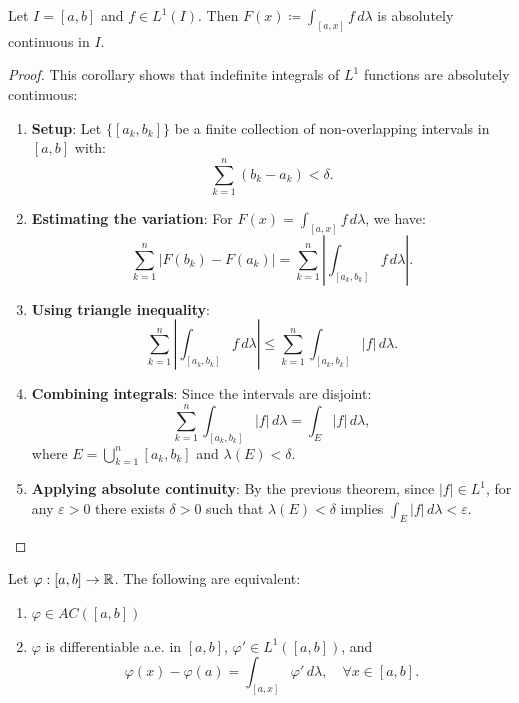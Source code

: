 \clearpage
\begin{corollary}
Let $I = [a,b]$ and $f \in L^1(I)$. Then $F(x) \coloneqq \int_{[a,x]} f \, d\lambda$ is absolutely continuous in $I$.
\end{corollary}

\begin{proof}
This corollary shows that indefinite integrals of $L^1$ functions are absolutely continuous:

\begin{enumerate}
\item \textbf{Setup}: Let $\{[a_k, b_k]\}$ be a finite collection of non-overlapping intervals in $[a,b]$ with:
\[
\sum_{k=1}^n (b_k - a_k) < \delta.
\]

\item \textbf{Estimating the variation}: For $F(x) = \int_{[a,x]} f \, d\lambda$, we have:
\[
\sum_{k=1}^n |F(b_k) - F(a_k)| = \sum_{k=1}^n \left| \int_{[a_k, b_k]} f \, d\lambda \right|.
\]

\item \textbf{Using triangle inequality}: 
\[
\sum_{k=1}^n \left| \int_{[a_k, b_k]} f \, d\lambda \right| \leq \sum_{k=1}^n \int_{[a_k, b_k]} |f| \, d\lambda.
\]

\item \textbf{Combining integrals}: Since the intervals are disjoint:
\[
\sum_{k=1}^n \int_{[a_k, b_k]} |f| \, d\lambda = \int_E |f| \, d\lambda,
\]
where $E = \bigcup_{k=1}^n [a_k, b_k]$ and $\lambda(E) < \delta$.

\item \textbf{Applying absolute continuity}: By the previous theorem, since $|f| \in L^1$, for any $\varepsilon > 0$ there exists $\delta > 0$ such that $\lambda(E) < \delta$ implies $\int_E |f| \, d\lambda < \varepsilon$.
\end{enumerate}
\end{proof}

\clearpage
\begin{theorem}
Let $\varphi: [a,b] \to \mathbb{R}$. The following are equivalent:
\begin{enumerate}
\item $\varphi \in AC([a,b])$
\item $\varphi$ is differentiable a.e. in $[a,b]$, $\varphi' \in L^1([a,b])$, and
\[
\varphi(x) - \varphi(a) = \int_{[a,x]} \varphi' \, d\lambda, \quad \forall x \in [a,b].
\]
\end{enumerate}
\end{theorem}

